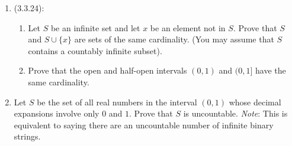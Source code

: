 \documentclass[10pt]{article}
\begin{document}
\begin{enumerate}
\item (3.3.24):
\begin{enumerate}
\item Let $S$ be an infinite set and let $x$ be an element not in $S$. Prove that $S$ and
$S\cup \{x\}$ are sets of the same cardinality. (You may assume that $S$ contains a
countably infinite subset).
\item Prove that the open and half-open intervals $(0,1)$ and $(0,1]$ have the same cardinality.
\end{enumerate}

\item Let $S$ be the set of all real numbers in the interval $(0,1)$ whose decimal expansions
involve only $0$ and $1$. Prove that $S$ is uncountable. \emph{Note}: This is equivalent to
saying there are an uncountable number of infinite binary strings.

\end{enumerate}
\end{document}
